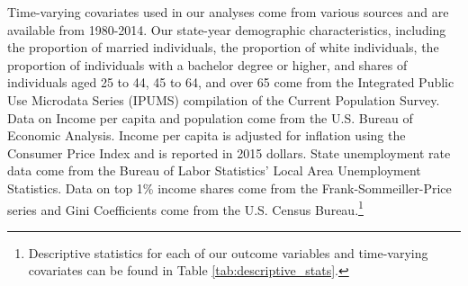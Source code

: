 \documentclass[../Main.tex]{subfiles}
\begin{document}
\indent Time-varying covariates used in our analyses come from various sources and are available from 1980-2014. Our state-year demographic characteristics, including the proportion of married individuals, the proportion of white individuals, the proportion of individuals with a bachelor degree or higher, and shares of individuals aged 25 to 44, 45 to 64, and over 65 come from the Integrated Public Use Microdata Series (IPUMS) compilation of the Current Population Survey. Data on Income per capita and population come from the U.S. Bureau of Economic Analysis. Income per capita is adjusted for inflation using the Consumer Price Index and is reported in 2015 dollars. State unemployment rate data come from the Bureau of Labor Statistics’ Local Area Unemployment Statistics. Data on top 1\% income shares come from the Frank-Sommeiller-Price series \citep{frank2015performance} and Gini Coefficients come from the U.S. Census Bureau.\footnote{Descriptive statistics for each of our outcome variables and time-varying covariates can be found in Table \ref{tab:descriptive_stats}.}
\end{document}
